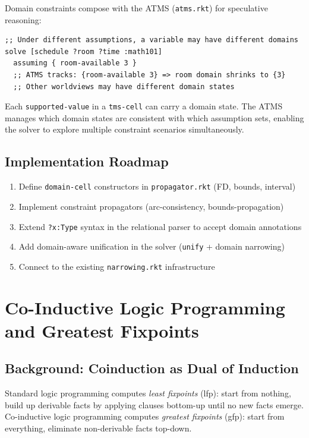 \documentclass[11pt]{article}
\begin{document}
Domain constraints compose with the ATMS (\texttt{atms.rkt}) for speculative reasoning:

\begin{verbatim}
;; Under different assumptions, a variable may have different domains
solve [schedule ?room ?time :math101]
  assuming { room-available 3 }
  ;; ATMS tracks: {room-available 3} => room domain shrinks to {3}
  ;; Other worldviews may have different domain states
\end{verbatim}

Each \texttt{supported-value} in a \texttt{tms-cell} can carry a domain state. The ATMS
manages which domain states are consistent with which assumption sets,
enabling the solver to explore multiple constraint scenarios simultaneously.
\subsection{Implementation Roadmap}
\label{sec:org3827cf6}

\begin{enumerate}
\item Define \texttt{domain-cell} constructors in \texttt{propagator.rkt} (FD, bounds, interval)
\item Implement constraint propagators (arc-consistency, bounds-propagation)
\item Extend \texttt{?x:Type} syntax in the relational parser to accept domain annotations
\item Add domain-aware unification in the solver (\texttt{unify} + domain narrowing)
\item Connect to the existing \texttt{narrowing.rkt} infrastructure
\end{enumerate}
\section{Co-Inductive Logic Programming and Greatest Fixpoints}
\label{sec:orgaa8daef}

\subsection{Background: Coinduction as Dual of Induction}
\label{sec:org287422e}

Standard logic programming computes \emph{least fixpoints} (lfp): start from nothing,
build up derivable facts by applying clauses bottom-up until no new facts emerge.
Co-inductive logic programming computes \emph{greatest fixpoints} (gfp): start from
everything, eliminate non-derivable facts top-down.
\end{document}
